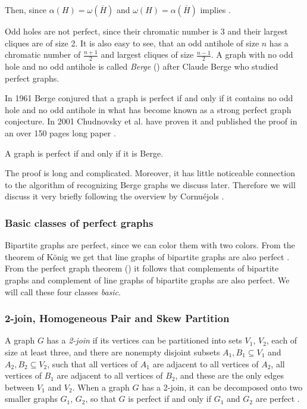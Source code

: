 
Then, since $\alpha(H) = \omega(\overline{H})$ and $\omega(H) = \alpha(\overline{H})$  implies .

Odd holes are not perfect, since their chromatic number is 3 and their largest cliques are of size 2. It is also easy to see, that an odd antihole of size $n$ has a chromatic number of $\frac{n+1}{2}$ and largest cliques of size $\frac{n-1}{2}$. A graph with no odd hole and no odd antihole is called \emph{Berge} () after Claude Berge who studied perfect graphs.

In 1961 Berge conjured that a graph is perfect if and only if it contains no odd hole and no odd antihole in what has become known as a strong perfect graph conjecture. In 2001 Chudnovsky et al. have proven it and published the proof in an over 150 pages long paper  \cite{MC06}.

\begin{theorem}
	\label{thm:spgt}
	A graph is perfect if and only if it is Berge.
\end{theorem}

The proof is long and complicated. Moreover, it has little noticeable connection to the algorithm of recognizing Berge graphs we discuss later. Therefore we will discuss it very briefly following the overview by Cornuéjols \cite{GC03}.

\subsubsection{Basic classes of perfect graphs}
Bipartite graphs are perfect, since we can color them with two colors. From the theorem of König we get that line graphs of bipartite graphs are also perfect \cite{Knig1916, GC03}. From the perfect graph theorem () it follows that complements of bipartite graphs and complement of line graphs of bipartite graphs are also perfect. We will call these four classes \emph{basic}.

\subsubsection{2-join, Homogeneous Pair and Skew Partition}
A graph $G$ has a \emph{2-join} if its vertices can be partitioned into sets $V_1$, $V_2$, each of size at least three, and there are nonempty disjoint subsets $A_1, B_1 \subseteq V_1$ and $A_2, B_2 \subseteq V_2$, such that all vertices of $A_1$ are adjacent to all vertices of $A_2$, all vertices of $B_1$ are adjacent to all vertices of $B_2$, and these are the only edges between $V_1$ and $V_2$. When a graph $G$ has a 2-join, it can be decomposed onto two smaller graphs $G_1$, $G_2$, so that $G$ is perfect if and only if $G_1$ and $G_2$ are perfect \cite{Cornujols1985}.

